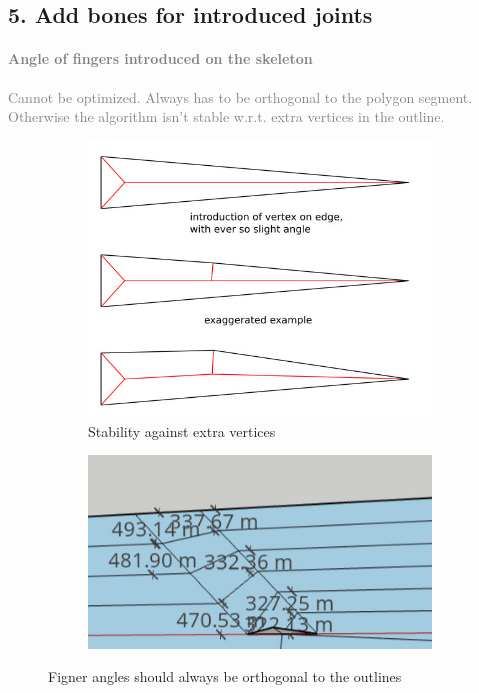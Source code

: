 \subsection{5. Add bones for introduced joints}
\textcolor{gray}{
\paragraph{Angle of fingers introduced on the skeleton}
Cannot be optimized.
Always has to be orthogonal to the polygon segment.
Otherwise the algorithm isn't stable w.r.t. extra vertices in the outline.
}
\begin{figure}[H]
\begin{subfigure}{0.45\columnwidth}
\includegraphics[width=\columnwidth]{sources/method/finger_angles.jpg}
\caption{Stability against extra vertices}
\label{finger_angles_stability}
\end{subfigure}
\begin{subfigure}{0.45\columnwidth}
\includegraphics[width=\columnwidth]{sources/method/finger_angles_2.jpg}
\end{subfigure}
\caption{Figner angles should always be orthogonal to the outlines}
\label{finger_angles}
\end{figure}






